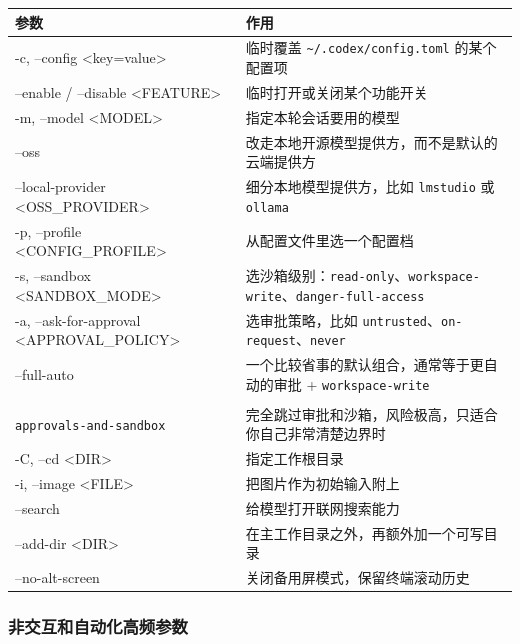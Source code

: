 \documentclass[UTF8,a4paper,12pt]{ctexart}
\begin{document}
\begin{longtable}{>{\ttfamily\raggedright\arraybackslash}p{} >{\raggedright\arraybackslash}p{}}
\toprule
参数 & 作用 \\
\midrule
\endhead
-c, --config <key=value> & 临时覆盖 \texttt{\textasciitilde/.codex/config.toml} 的某个配置项 \\
--enable / --disable <FEATURE> & 临时打开或关闭某个功能开关 \\
-m, --model <MODEL> & 指定本轮会话要用的模型 \\
--oss & 改走本地开源模型提供方，而不是默认的云端提供方 \\
--local-provider <OSS\_PROVIDER> & 细分本地模型提供方，比如 \texttt{lmstudio} 或 \texttt{ollama} \\
-p, --profile <CONFIG\_PROFILE> & 从配置文件里选一个配置档 \\
-s, --sandbox <SANDBOX\_MODE> & 选沙箱级别：\texttt{read-only}、\texttt{workspace-write}、\texttt{danger-full-access} \\
-a, --ask-for-approval <APPROVAL\_POLICY> & 选审批策略，比如 \texttt{untrusted}、\texttt{on-request}、\texttt{never} \\
--full-auto & 一个比较省事的默认组合，通常等于更自动的审批 + \texttt{workspace-write} \\
\shortstack[l]{\texttt{--dangerously-bypass-}\\\texttt{approvals-and-sandbox}} & 完全跳过审批和沙箱，风险极高，只适合你自己非常清楚边界时 \\
-C, --cd <DIR> & 指定工作根目录 \\
-i, --image <FILE> & 把图片作为初始输入附上 \\
--search & 给模型打开联网搜索能力 \\
--add-dir <DIR> & 在主工作目录之外，再额外加一个可写目录 \\
--no-alt-screen & 关闭备用屏模式，保留终端滚动历史 \\
\bottomrule
\end{longtable}

\subsubsection*{非交互和自动化高频参数}
\end{document}
